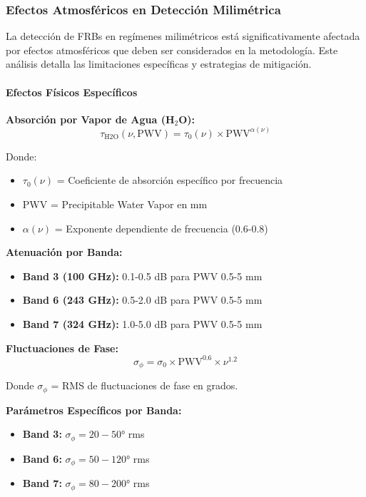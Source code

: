 \subsubsection{Efectos Atmosféricos en Detección Milimétrica}

La detección de FRBs en regímenes milimétricos está significativamente afectada por efectos atmosféricos que deben ser considerados en la metodología. Este análisis detalla las limitaciones específicas y estrategias de mitigación.

\paragraph{Efectos Físicos Específicos}

\textbf{Absorción por Vapor de Agua (H$_2$O):}
\[
\tau_{\text{H2O}}(\nu, \text{PWV}) = \tau_0(\nu) \times \text{PWV}^{\alpha(\nu)}
\]

Donde:
\begin{itemize}
\item $\tau_0(\nu)$ = Coeficiente de absorción específico por frecuencia
\item $\text{PWV}$ = Precipitable Water Vapor en mm
\item $\alpha(\nu)$ = Exponente dependiente de frecuencia (0.6-0.8)
\end{itemize}

\textbf{Atenuación por Banda:}
\begin{itemize}
\item \textbf{Band 3 (100 GHz):} 0.1-0.5 dB para PWV 0.5-5 mm
\item \textbf{Band 6 (243 GHz):} 0.5-2.0 dB para PWV 0.5-5 mm
\item \textbf{Band 7 (324 GHz):} 1.0-5.0 dB para PWV 0.5-5 mm
\end{itemize}

\textbf{Fluctuaciones de Fase:}
\[
\sigma_{\phi} = \sigma_0 \times \text{PWV}^{0.6} \times \nu^{1.2}
\]

Donde $\sigma_{\phi}$ = RMS de fluctuaciones de fase en grados.

\textbf{Parámetros Específicos por Banda:}
\begin{itemize}
\item \textbf{Band 3:} $\sigma_{\phi} = 20-50°$ rms
\item \textbf{Band 6:} $\sigma_{\phi} = 50-120°$ rms  
\item \textbf{Band 7:} $\sigma_{\phi} = 80-200°$ rms
\end{itemize}

